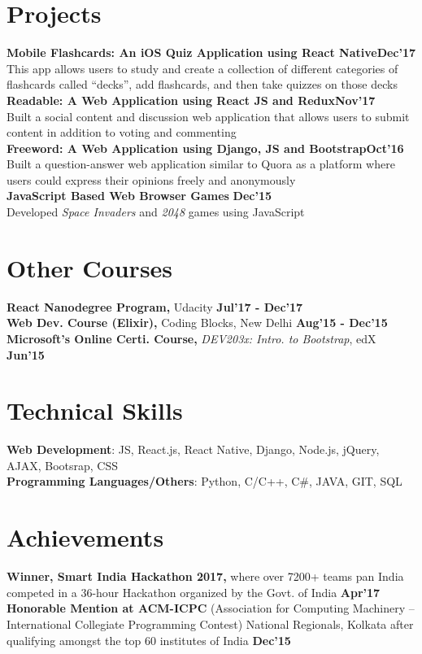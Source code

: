 \documentclass[margin,line]{res}
\begin{document}
\begin{resume}
\section{\sc Projects}
{\bf Mobile Flashcards: An iOS Quiz Application using React Native}\hfill {\bf Dec'17}\\
This app allows users to study and create a collection of different categories of flashcards called “decks”, add
flashcards, and then take quizzes on those decks\\ 
{\bf Readable: A Web Application using React JS and Redux}\hfill {\bf Nov'17}\\
Built a social content and discussion web application that allows users to submit content in addition to voting
and commenting\\
{\bf Freeword: A Web Application using Django, JS and Bootstrap}\hfill {\bf Oct'16}\\
Built a question-answer web application similar to Quora as a platform where users could express their opinions freely and anonymously \\
{\bf JavaScript Based Web Browser Games} \hfill {\bf Dec'15}\\
Developed {\it Space Invaders} and {\it 2048} games using JavaScript 

\section{\sc Other Courses}
{\bf React Nanodegree Program,} Udacity \hfill {\bf Jul'17 - Dec'17} \\
{\bf Web Dev. Course (Elixir),} Coding Blocks, New Delhi \hfill {\bf Aug'15 - Dec'15} \\
{\bf Microsoft’s Online Certi. Course,} {\it DEV203x: Intro. to Bootstrap}, edX \hfill {\bf Jun'15}

\section{\sc Technical Skills}
{\bf Web Development}: JS, React.js, React Native, Django, Node.js, jQuery, AJAX, Bootsrap, CSS\\
{\bf Programming Languages/Others}: Python, C/C++, C\#, JAVA, GIT, SQL

\section{\sc Achievements}
{\bf Winner, Smart India Hackathon 2017,} where over 7200+ teams pan India competed in a 36-hour Hackathon organized by the Govt. of India \hfill {\bf Apr'17} \\
{\bf Honorable Mention at ACM-ICPC} (Association for Computing Machinery – International Collegiate
Programming Contest) National Regionals, Kolkata after qualifying amongst the top 60 institutes of India \hfill {\bf Dec'15}

\end{resume}
\end{document}
